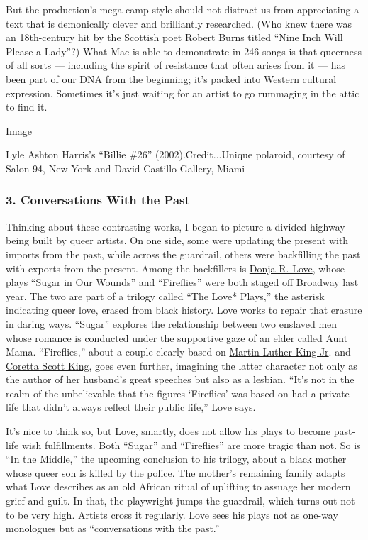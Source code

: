 But the production's mega-camp style should not distract us from
appreciating a text that is demonically clever and brilliantly
researched. (Who knew there was an 18th-century hit by the Scottish poet
Robert Burns titled ``Nine Inch Will Please a Lady''?) What Mac is able
to demonstrate in 246 songs is that queerness of all sorts --- including
the spirit of resistance that often arises from it --- has been part of
our DNA from the beginning; it's packed into Western cultural
expression. Sometimes it's just waiting for an artist to go rummaging in
the attic to find it.

Image

Lyle Ashton Harris's ``Billie \#26'' (2002).Credit...Unique polaroid,
courtesy of Salon 94, New York and David Castillo Gallery, Miami

\hypertarget{3-conversations-with-the-past}{%
\subsubsection{3. Conversations With the
Past}\label{3-conversations-with-the-past}}

Thinking about these contrasting works, I began to picture a divided
highway being built by queer artists. On one side, some were updating
the present with imports from the past, while across the guardrail,
others were backfilling the past with exports from the present. Among
the backfillers is \href{https://newdramatists.org/donja-r-love}{Donja
R. Love}, whose plays ``Sugar in Our Wounds'' and ``Fireflies'' were
both staged off Broadway last year. The two are part of a trilogy called
``The Love* Plays,'' the asterisk indicating queer love, erased from
black history. Love works to repair that erasure in daring ways.
``Sugar'' explores the relationship between two enslaved men whose
romance is conducted under the supportive gaze of an elder called Aunt
Mama. ``Fireflies,'' about a couple clearly based on
\href{https://www.nytimes3xbfgragh.onion/topic/person/martin-luther-king-jr}{Martin
Luther King Jr}. and
\href{https://www.nytimes3xbfgragh.onion/topic/person/coretta-scott-king}{Coretta
Scott King}, goes even further, imagining the latter character not only
as the author of her husband's great speeches but also as a lesbian.
``It's not in the realm of the unbelievable that the figures `Fireflies'
was based on had a private life that didn't always reflect their public
life,'' Love says.

It's nice to think so, but Love, smartly, does not allow his plays to
become past-life wish fulfillments. Both ``Sugar'' and ``Fireflies'' are
more tragic than not. So is ``In the Middle,'' the upcoming conclusion
to his trilogy, about a black mother whose queer son is killed by the
police. The mother's remaining family adapts what Love describes as an
old African ritual of uplifting to assuage her modern grief and guilt.
In that, the playwright jumps the guardrail, which turns out not to be
very high. Artists cross it regularly. Love sees his plays not as
one-way monologues but as ``conversations with the past.''

